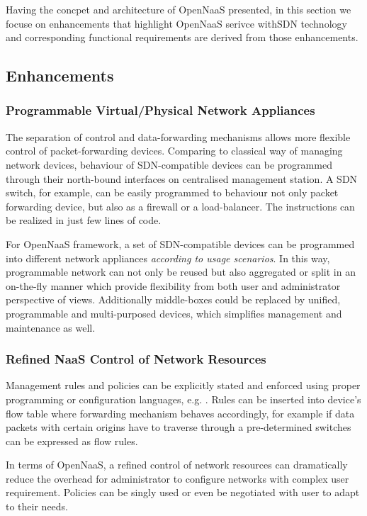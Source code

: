 \label{naas-sdn}

Having the concpet and architecture of OpenNaaS presented, in this section we
focuse on enhancements that highlight OpenNaaS serivce withSDN technology and
corresponding functional requirements are derived from those enhancements. 

\subsection{Enhancements}
	
	\subsubsection{Programmable Virtual/Physical Network Appliances}

	The separation of control and data-forwarding mechanisms allows more flexible control
	of packet-forwarding devices. Comparing to classical way of managing
	network devices, behaviour of SDN-compatible devices can be programmed
	through their north-bound interfaces on centralised management station. A
	SDN switch, for example, can be easily programmed to behaviour not only
	packet forwarding device, but also as a firewall or a load-balancer. The
	instructions can be realized in just few lines of code. 

	For OpenNaaS framework, a set of SDN-compatible devices can be programmed
	into different network appliances \emph{according to usage scenarios}.  In
	this way, programmable network can not only be reused but also aggregated
	or split in an on-the-fly manner which provide flexibility from both user
	and administrator perspective of views. Additionally middle-boxes could be
	replaced by unified, programmable and multi-purposed devices, which
	simplifies management and maintenance as well. 

	
	\subsubsection{Refined NaaS Control of Network Resources}

	Management rules and policies can be explicitly stated and enforced using
	proper programming or configuration languages, e.g. \cite{maple, frenetic}.
	Rules can be inserted into device's flow table where forwarding mechanism
	behaves accordingly, for example if data packets with certain origins have
	to traverse through a pre-determined switches can be expressed as flow
	rules.

	In terms of OpenNaaS, a refined control of network resources can
	dramatically reduce the overhead for administrator to configure networks
	with complex user requirement. Policies can be singly used or even be
	negotiated with user to adapt to their needs.

